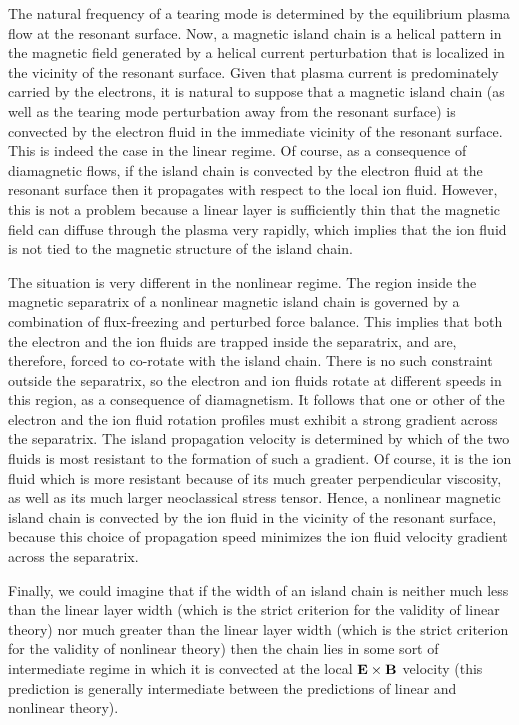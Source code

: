 \documentclass[12pt,prb,aps]{revtex4-1}
\begin{document}
 The natural frequency of a tearing mode 
is determined by the equilibrium plasma flow at the
resonant surface. Now, a magnetic island chain is a helical
pattern in the magnetic field  generated by a helical current perturbation that is localized in the
vicinity of the resonant surface.
Given that plasma current is predominately carried by the
electrons, it is natural to suppose that a magnetic
island chain (as well as the tearing mode perturbation
away from the resonant surface)  is convected by the
electron fluid in the immediate vicinity of the resonant
surface. This is indeed the case in the linear regime.\cite{ara} Of course, as a consequence of diamagnetic flows, if the island chain is
convected by the electron fluid at the resonant surface then it propagates with respect to the local ion fluid. However, this is not a
problem because a linear layer is sufficiently thin that the magnetic field can diffuse through the plasma very rapidly, which implies that
the ion fluid is not tied to the magnetic structure of the island chain. 

The situation is very different in the nonlinear regime. 
The region inside the magnetic separatrix of a nonlinear magnetic island chain is governed by a combination of flux-freezing and perturbed force balance.
This implies that both the electron and the ion fluids are trapped inside the separatrix, and are, therefore,  forced to co-rotate with the island chain. There
is no such constraint outside the separatrix, so the electron and ion fluids rotate at different speeds in this region,
as a consequence of diamagnetism.  It follows that one or other of the electron and the ion fluid rotation profiles must exhibit a strong gradient across
the separatrix. The island propagation velocity is determined by which of the two fluids is most resistant to the formation of such a gradient. 
Of course, it is the ion fluid which is more resistant because of its much greater perpendicular viscosity,\cite{nl1,wat} as well as its much larger 
neoclassical stress tensor.\cite{nl2} Hence, a nonlinear magnetic island chain is convected by the ion fluid in the vicinity of the resonant 
surface, because this choice of propagation speed minimizes the ion fluid velocity gradient across the separatrix.

Finally, we could imagine that if the width of an island chain is neither much less than the linear layer width (which is the strict
criterion for the validity of linear theory) nor much greater than the linear layer width (which is the strict criterion for
the validity of nonlinear theory) then the chain lies in some sort of intermediate regime in which it is
convected at the local ${\bf E}\times {\bf B}$ velocity (this prediction is generally intermediate between the predictions of linear and nonlinear theory). 
\end{document}
